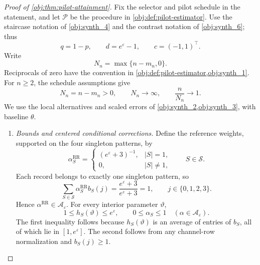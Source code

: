 \documentclass[11pt]{article}
\begin{document}
\begin{proof}[Proof of \cref{obj:thm:pilot-attainment}]
Fix the selector and pilot schedule in the statement, and let \(\mathcal P\) be the procedure in \cref{obj:def:pilot-estimator}. Use the staircase notation of \cref{obj:synth_4} and the contrast notation of \cref{obj:synth_6}; thus
\[
q=1-p,\qquad d=e^\varepsilon-1,\qquad c=(-1,1)^\top.
\]
Write
\[
N_n=\max\{n-m_n,0\}.
\]
Reciprocals of zero have the convention in \cref{obj:def:pilot-estimator,obj:synth_1}. For \(n\ge2\), the schedule assumptions give
\[
N_n=n-m_n>0,\qquad
N_n\longrightarrow\infty,\qquad
\frac{n}{N_n}\longrightarrow1.
\]
We use the local alternatives and scaled errors of \cref{obj:synth_2,obj:synth_3}, with baseline \(\theta\).

\begin{enumerate}
\item \emph{Bounds and centered conditional corrections.}
Define the reference weights, supported on the four singleton patterns, by
\[
\alpha^{\mathrm{RR}}_S=
\begin{cases}
(e^\varepsilon+3)^{-1},& |S|=1,\\
0,& |S|\ne1,
\end{cases}
\qquad S\in\mathcal S.
\]
Each record belongs to exactly one singleton pattern, so
\[
\sum_{S\in\mathcal S}\alpha^{\mathrm{RR}}_S b_S(j)
=\frac{e^\varepsilon+3}{e^\varepsilon+3}=1,
\qquad j\in\{0,1,2,3\}.
\]
Hence \(\alpha^{\mathrm{RR}}\in\mathcal A_\varepsilon\). For every interior parameter \(\vartheta\),
\[
1\le h_S(\vartheta)\le e^\varepsilon,
\qquad
0\le\alpha_S\le1
\quad(\alpha\in\mathcal A_\varepsilon).
\]
The first inequality follows because \(h_S(\vartheta)\) is an average of entries of \(b_S\), all of which lie in \([1,e^\varepsilon]\). The second follows from any channel-row normalization and \(b_S(j)\ge1\).


\end{enumerate}
\end{proof}
\end{document}
